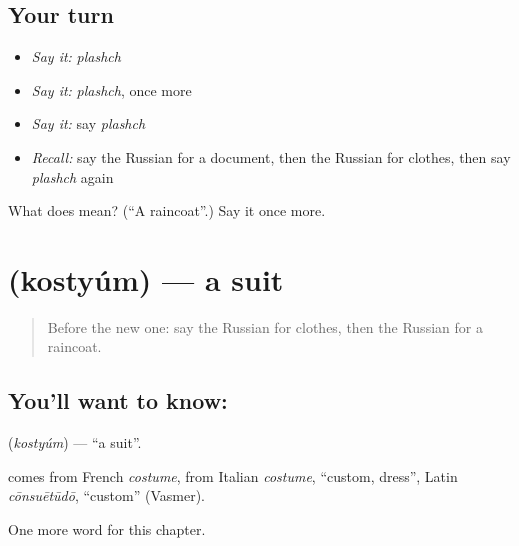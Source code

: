\subsection*{Your turn}
\begin{itemize}
\raggedright
  \item \emph{Say it:} \emph{plashch}
  \item \emph{Say it:} \emph{plashch}, once more
  \item \emph{Say it:} say \emph{plashch}
  \item \emph{Recall:} say the Russian for a document, then the Russian for clothes, then say \emph{plashch} again
\end{itemize}

\begin{tcolorbox}[breakable,colback=teal!4,colframe=teal!35!black,title={Before you move on}]
What does  mean? (\textquotedblleft{}A raincoat\textquotedblright{}.) Say it once more.
\end{tcolorbox}
\section[\texorpdfstring{\ru{костюм} (kostyúm)}{костюм (kostyúm)}]{ (kostyúm) — a suit}

\label{lesson:RU-C248-kostyum}



\begin{quote}
Before the new one: say the Russian for clothes, then the Russian for a raincoat.
\end{quote}

\subsection*{You'll want to know: }
\textbf{} (\emph{kostyúm}) — \textquotedblleft{}a suit\textquotedblright{}.

\begin{cousinweb}
\textbf{} comes from French \emph{costume}, from Italian \emph{costume}, \textquotedblleft{}custom, dress\textquotedblright{}, Latin \emph{cōnsuētūdō}, \textquotedblleft{}custom\textquotedblright{} (Vasmer).
\end{cousinweb}

\begin{grammarlens}[title={What you've built}]
One more word for this chapter.
\end{grammarlens}

